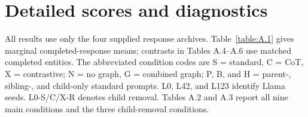 \chapter{Detailed scores and diagnostics}

All results use only the four supplied response archives. Table~\ref{table:A.1} gives marginal completed-response means; contrasts in Tables A.4–A.6 use matched completed entities. The abbreviated condition codes are S = standard, C = CoT, X = contrastive; N = no graph, G = combined graph; P, B, and H = parent-, sibling-, and child-only standard prompts. L0, L42, and L123 identify Llama seeds. L0-S/C/X-R denotes child removal. Tables A.2 and A.3 report all nine main conditions and the three child-removal conditions.


\begingroup
\setlength{\tabcolsep}{3pt}
\renewcommand{\arraystretch}{1.18}
\fontsize{7.8}{9.5}\selectfont
\renewcommand{\thetable}{A.1}
